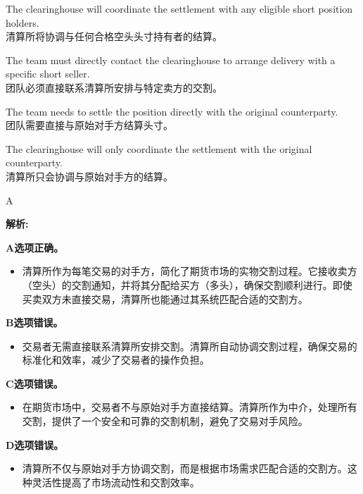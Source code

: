 \documentclass{article}
\newenvironment{explanation}
{\textbf{解析:}\par}
{\par}
\begin{document}
    \begin{choices}
        \item The clearinghouse will coordinate the settlement with any eligible short position holders.\\
        清算所将协调与任何合格空头头寸持有者的结算。
        
        \item The team must directly contact the clearinghouse to arrange delivery with a specific short seller.\\
        团队必须直接联系清算所安排与特定卖方的交割。
        
        \item The team needs to settle the position directly with the original counterparty.\\
        团队需要直接与原始对手方结算头寸。
        
        \item The clearinghouse will only coordinate the settlement with the original counterparty.\\
        清算所只会协调与原始对手方的结算。
    \end{choices}
    
    \begin{correctanswer}
    A
    \end{correctanswer}
    
    \begin{explanation}
    
    
        \textbf{A选项正确。}
        \begin{itemize}
            \item 清算所作为每笔交易的对手方，简化了期货市场的实物交割过程。它接收卖方（空头）的交割通知，并将其分配给买方（多头），确保交割顺利进行。即使买卖双方未直接交易，清算所也能通过其系统匹配合适的交割方。
        \end{itemize}
        
        \textbf{B选项错误。}
        \begin{itemize}
            \item 交易者无需直接联系清算所安排交割。清算所自动协调交割过程，确保交易的标准化和效率，减少了交易者的操作负担。
        \end{itemize}
        
        \textbf{C选项错误。}
        \begin{itemize}
            \item 在期货市场中，交易者不与原始对手方直接结算。清算所作为中介，处理所有交割，提供了一个安全和可靠的交割机制，避免了交易对手风险。
        \end{itemize}
        
        \textbf{D选项错误。}
        \begin{itemize}
            \item 清算所不仅与原始对手方协调交割，而是根据市场需求匹配合适的交割方。这种灵活性提高了市场流动性和交割效率。
        \end{itemize}
    
    \end{explanation}
    
\end{document}
